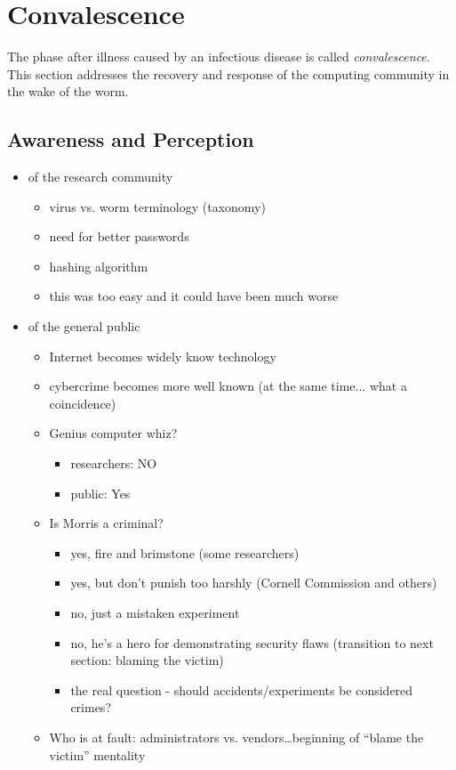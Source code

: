 \section*{Convalescence}

The phase after illness caused by an infectious disease is called
\textit{convalescence}. This section addresses the recovery and response of the
computing community in the wake of the worm.

\subsection*{Awareness and Perception}
		\begin{itemize}
		\item of the research community
        	\begin{itemize}
			\item virus vs. worm terminology (taxonomy)
			\item need for better passwords
			\item hashing algorithm
            \item this was too easy and it could have been much worse
           	\end{itemize}
		\item of the general public
           	\begin{itemize}
   			\item Internet becomes widely know technology
            \item cybercrime becomes more well known (at the same time... what a coincidence)
            \item Genius computer whiz?
            	\begin{itemize}
            		\item researchers: NO	
            		\item public: Yes	
            	\end{itemize}
        \item Is Morris a criminal?
            	\begin{itemize}
                \item yes, fire and brimstone (some researchers)
                \item yes, but don't punish too harshly (Cornell Commission and others)
                \item no, just a mistaken experiment
                \item no, he's a hero for demonstrating security flaws (transition to next section: blaming the victim)
                \item the real question - should accidents/experiments be considered crimes?
            	\end{itemize}
       \item Who is at fault: administrators vs. vendors\ldots beginning of
       ``blame the victim'' mentality
       \end{itemize}


\end{itemize}
